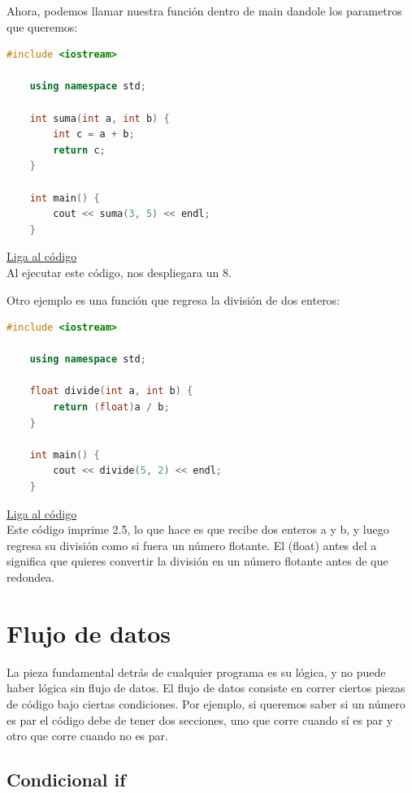 \documentclass{article}
\begin{document}
Ahora, podemos llamar nuestra función dentro de main dandole los parametros que queremos:

\begin{lstlisting}[language=C++, caption=Función de suma]
    #include <iostream>

    using namespace std;
    
    int suma(int a, int b) {
        int c = a + b;
        return c;
    }

    int main() {
        cout << suma(3, 5) << endl;
    }
\end{lstlisting}
\href{https://repl.it/@Jamesscn/Funciones}{Liga al código}\\

Al ejecutar este código, nos despliegara un 8.

Otro ejemplo es una función que regresa la división de dos enteros:

\begin{lstlisting}[language=C++, caption=Función de división]
    #include <iostream>

    using namespace std;
    
    float divide(int a, int b) {
        return (float)a / b;
    }

    int main() {
        cout << divide(5, 2) << endl;
    }
\end{lstlisting}
\href{https://repl.it/@Jamesscn/Funciones}{Liga al código}\\

Este código imprime 2.5, lo que hace es que recibe dos enteros a y b, y luego regresa su división como si fuera un número flotante. El (float) antes del a significa que quieres convertir la división en un número flotante antes de que redondea.

\section{Flujo de datos}

La pieza fundamental detrás de cualquier programa es su lógica, y no puede haber lógica sin flujo de datos. El flujo de datos consiste en correr ciertos piezas de código bajo ciertas condiciones. Por ejemplo, si queremos saber si un número es par el código debe de tener dos secciones, uno que corre cuando sí es par y otro que corre cuando no es par.

\subsection{Condicional if}
\end{document}
